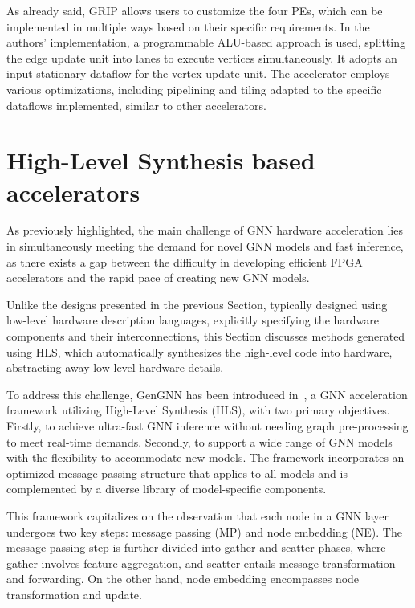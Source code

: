 As already said, GRIP allows users to customize the four PEs, which can be implemented in multiple ways based on their specific requirements.
In the authors' implementation, a programmable ALU-based approach is used, splitting the edge update unit into lanes to execute vertices simultaneously.
It adopts an input-stationary dataflow for the vertex update unit.
The accelerator employs various optimizations, including pipelining and tiling adapted to the specific dataflows implemented, similar to other accelerators.

\section{High-Level Synthesis based accelerators}
\label{sec:hls-accelerators}%

As previously highlighted, the main challenge of GNN hardware acceleration lies in simultaneously meeting the demand for novel GNN models and fast inference, as there exists a gap between the difficulty in developing efficient FPGA accelerators and the rapid pace of creating new GNN models.

Unlike the designs presented in the previous Section, typically designed using low-level hardware description languages, explicitly specifying the hardware components and their interconnections, this Section discusses methods generated using HLS, which automatically synthesizes the high-level code into hardware, abstracting away low-level hardware details.

To address this challenge, GenGNN has been introduced in~\cite{DBLP:journals/corr/abs-2201-08475}, a GNN acceleration framework utilizing High-Level Synthesis (HLS), with two primary objectives.
Firstly, to achieve ultra-fast GNN inference without needing graph pre-processing to meet real-time demands.
Secondly, to support a wide range of GNN models with the flexibility to accommodate new models.
The framework incorporates an optimized message-passing structure that applies to all models and is complemented by a diverse library of model-specific components.

This framework capitalizes on the observation that each node in a GNN layer undergoes two key steps: message passing (MP) and node embedding (NE). The message passing step is further divided into gather and scatter phases, where gather involves feature aggregation, and scatter entails message transformation and forwarding.
On the other hand, node embedding encompasses node transformation and update.

